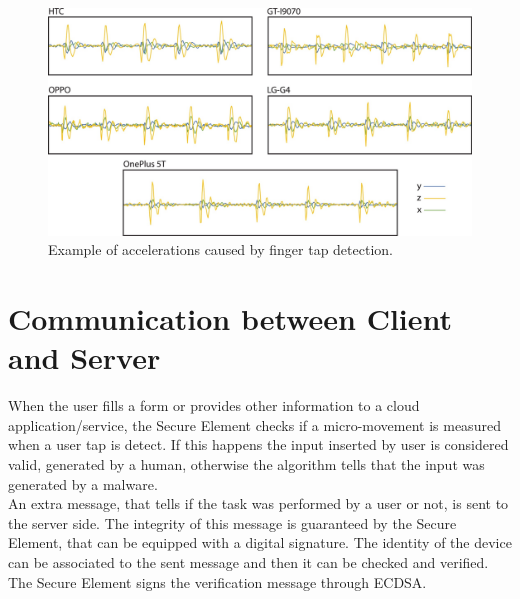 \begin{figure}[h]
     \centering
     \includegraphics[width=.8\linewidth]{Images/InvisibleCAPPCHA/tap}
     \caption{\footnotesize{Example of accelerations caused by finger tap detection.}}\label{inv:tap}
\end{figure}


\section{Communication between Client and Server}\label{inv:communication}
When the user fills a form or provides other information to a cloud application/service, the Secure Element checks if a micro-movement is measured when a user tap is detect. If this happens the input inserted by user is considered valid, generated by a human, otherwise the algorithm tells that the input was generated by a malware.\\
An extra message, that tells if the task was performed by a user or not, is sent to the server side. The integrity of this message is guaranteed by the Secure Element, that can be equipped with a digital signature. The identity of the device can be associated to the sent message and then it can be checked and verified. The Secure Element signs the verification message through ECDSA.\\

